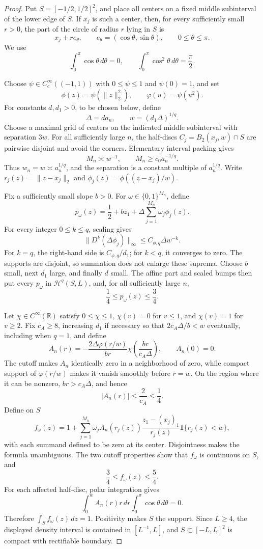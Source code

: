 \documentclass{article}
\begin{document}
\begin{proof}
Put \(S=[-1/2,1/2]^2\), and place all centers on a fixed middle subinterval of the lower edge of \(S\).  If \(x_j\) is such a center, then, for every sufficiently small \(r>0\), the part of the circle of radius \(r\) lying in \(S\) is
\[
 x_j+r e_\theta,
 \qquad e_\theta=(\cos\theta,\sin\theta),
 \qquad 0\leq\theta\leq\pi.
\]
We use
\[
 \int_0^\pi\cos\theta\,d\theta=0,
 \qquad
 \int_0^\pi\cos^2\theta\,d\theta=\frac\pi2.
\]

Choose \(\psi\in C_c^\infty((-1,1))\) with \(0\leq\psi\leq1\) and \(\psi(0)=1\), and set
\[
 \phi(z)=\psi(\lVert z\rVert_2^2),
 \qquad
 \varphi(u)=\psi(u^2).
\]
For constants \(d,d_1>0\), to be chosen below, define
\[
 \Delta=d a_n,
 \qquad
 w=(d_1\Delta)^{1/q}.
\]
Choose a maximal grid of centers on the indicated middle subinterval with separation \(3w\).  For all sufficiently large \(n\), the half-discs \(C_j=B_2(x_j,w)\cap S\) are pairwise disjoint and avoid the corners.  Elementary interval packing gives
\[
 M_n\asymp w^{-1},
 \qquad
 M_n\geq c_0a_n^{-1/q}.
\]
Thus \(w_n=w\asymp a_n^{1/q}\), and the separation is a constant multiple of \(a_n^{1/q}\).  Write \(r_j(z)=\lVert z-x_j\rVert_2\) and \(\phi_j(z)=\phi((z-x_j)/w)\).

Fix a sufficiently small slope \(b>0\).  For \(\omega\in\{0,1\}^{M_n}\), define
\[
 p_\omega(z)=\frac12+bz_1+\Delta\sum_{j=1}^{M_n}\omega_j\phi_j(z).
\]
For every integer \(0\leq k\leq q\), scaling gives
\[
 \lVert D^k(\Delta\phi_j)\rVert_\infty
 \leq C_{\phi,q}\Delta w^{-k}.
\]
For \(k=q\), the right-hand side is \(C_{\phi,q}/d_1\); for \(k<q\), it converges to zero.  The supports are disjoint, so summation does not enlarge these suprema.  Choose \(b\) small, next \(d_1\) large, and finally \(d\) small.  The affine part and scaled bumps then put every \(p_\omega\) in \(\mathcal H^q(S,L)\), and, for all sufficiently large \(n\),
\[
 \frac14\leq p_\omega(z)\leq\frac34.
\]

Let \(\chi\in C^\infty(\mathbb R)\) satisfy \(0\leq\chi\leq1\), \(\chi(v)=0\) for \(v\leq1\), and \(\chi(v)=1\) for \(v\geq2\).  Fix \(c_A\geq8\), increasing \(d_1\) if necessary so that \(2c_A\Delta/b<w\) eventually, including when \(q=1\), and define
\[
 A_n(r)=-\frac{2\Delta\varphi(r/w)}{br}
 \chi\!\left(\frac{br}{c_A\Delta}\right),
 \qquad A_n(0)=0.
\]
The cutoff makes \(A_n\) identically zero in a neighborhood of zero, while compact support of \(\varphi(r/w)\) makes it vanish smoothly before \(r=w\).  On the region where it can be nonzero, \(br>c_A\Delta\), and hence
\[
 |A_n(r)|\leq\frac{2}{c_A}\leq\frac14.
\]
Define on \(S\)
\[
 f_\omega(z)=1+
 \sum_{j=1}^{M_n}\omega_j A_n(r_j(z))
 \frac{z_1-(x_j)_1}{r_j(z)}\mathbf 1\{r_j(z)<w\},
\]
with each summand defined to be zero at its center.  Disjointness makes the formula unambiguous.  The two cutoff properties show that \(f_\omega\) is continuous on \(S\), and
\[
 \frac34\leq f_\omega(z)\leq\frac54.
\]
For each affected half-disc, polar integration gives
\[
 \int_0^w A_n(r)r\,dr\int_0^\pi\cos\theta\,d\theta=0.
\]
Therefore \(\int_S f_\omega(z)\,dz=1\).  Positivity makes \(S\) the support.  Since \(L\geq4\), the displayed density interval is contained in \([L^{-1},L]\), and \(S\subset[-L,L]^2\) is compact with rectifiable boundary.


\end{proof}
\end{document}
